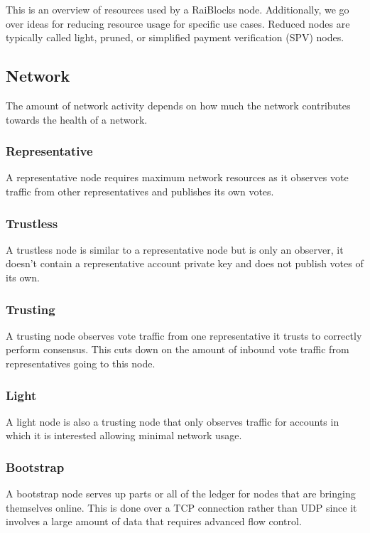 This is an overview of resources used by a RaiBlocks node. Additionally, we go over ideas for reducing resource usage for specific use cases. Reduced nodes are typically called light, pruned, or simplified payment verification (SPV) nodes.

\subsection{Network}
The amount of network activity depends on how much the network contributes towards the health of a network.

\subsubsection{Representative}
A representative node requires maximum network resources as it observes vote traffic from other representatives and publishes its own votes.

\subsubsection{Trustless}
A trustless node is similar to a representative node but is only an observer, it doesn't contain a representative account private key and does not publish votes of its own.

\subsubsection{Trusting}
A trusting node observes vote traffic from one representative it trusts to correctly perform consensus. This cuts down on the amount of inbound vote traffic from representatives going to this node.

\subsubsection{Light}
A light node is also a trusting node that only observes traffic for accounts in which it is interested allowing minimal network usage.

\subsubsection{Bootstrap}
A bootstrap node serves up parts or all of the ledger for nodes that are bringing themselves online. This is done over a TCP connection rather than UDP since it involves a large amount of data that requires advanced flow control.

